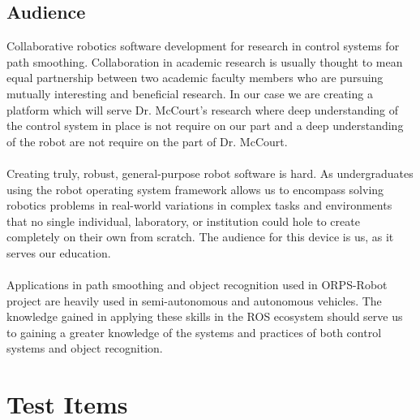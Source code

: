 \documentclass[english,12pt]{article}
\begin{document}
\subsection{Audience}
Collaborative robotics software development for research in control systems 
for path smoothing. Collaboration in academic research is usually thought to mean 
equal partnership between two academic faculty members who are pursuing mutually 
interesting and beneficial research. In our case we are creating a platform which 
will serve Dr. McCourt's research where deep understanding of the control system in 
place is not require on our part and a deep understanding of the robot are not 
require on the part of Dr. McCourt.\\\\
Creating truly, robust, general-purpose robot software is hard. As 
undergraduates using the robot operating system framework allows us to encompass 
solving robotics problems in real-world variations in complex tasks and 
environments that no single individual, laboratory, or institution could 
hole to create completely on their own from scratch. The audience for this 
device is us, as it serves our education.\\\\
Applications in path smoothing and object recognition used in 
ORPS-Robot project are heavily used in semi-autonomous and autonomous 
vehicles. The knowledge gained in applying these skills in the ROS ecosystem 
should serve us to gaining a greater knowledge of the systems and 
practices of both control systems and object recognition.
\section{Test Items}
\end{document}
